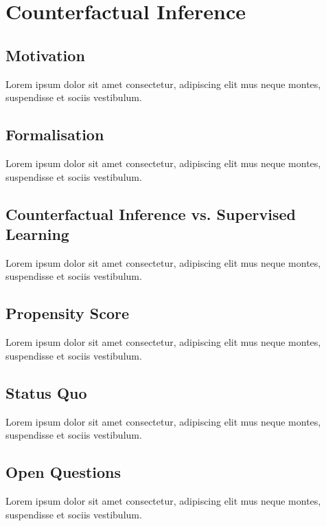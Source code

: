 \section{Counterfactual Inference}
\subsection{Motivation}
Lorem ipsum dolor sit amet consectetur, adipiscing elit mus neque montes, suspendisse et sociis vestibulum.

\subsection{Formalisation}
Lorem ipsum dolor sit amet consectetur, adipiscing elit mus neque montes, suspendisse et sociis vestibulum.

\subsection{Counterfactual Inference vs. Supervised Learning}
Lorem ipsum dolor sit amet consectetur, adipiscing elit mus neque montes, suspendisse et sociis vestibulum.

\subsection{Propensity Score}
Lorem ipsum dolor sit amet consectetur, adipiscing elit mus neque montes, suspendisse et sociis vestibulum.

\subsection{Status Quo}
Lorem ipsum dolor sit amet consectetur, adipiscing elit mus neque montes, suspendisse et sociis vestibulum.

\subsection{Open Questions}
Lorem ipsum dolor sit amet consectetur, adipiscing elit mus neque montes, suspendisse et sociis vestibulum.

